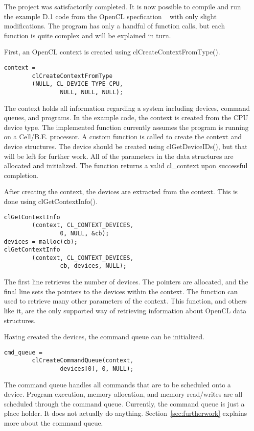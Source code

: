 The project was satisfactorily completed. It is now possible to compile and run the example D.1 code from the OpenCL specfication ~\cite{opencl} with only slight modifications. The program has only a handful of function calls, but each function is quite complex and will be explained in turn.

First, an OpenCL context is created using clCreateContextFromType().
\begin{verbatim}
context =
        clCreateContextFromType
        (NULL, CL_DEVICE_TYPE_CPU,
                NULL, NULL, NULL);
\end{verbatim}

The context holds all information regarding a system including devices, command queues, and programs. In the example code, the context is created from the CPU device type. The implemented function currently assumes the program is running on a Cell/B.E. processor. A custom function is called to create the context and device structures. The device should be created using clGetDeviceIDs(), but that will be left for further work. All of the parameters in the data structures are allocated and initialized. The function returns a valid cl\_context upon successful completion.

After creating the context, the devices are extracted from the context. This is done using clGetContextInfo().
\begin{verbatim}
clGetContextInfo
        (context, CL_CONTEXT_DEVICES,
                0, NULL, &cb);
devices = malloc(cb);
clGetContextInfo
        (context, CL_CONTEXT_DEVICES,
                cb, devices, NULL);
\end{verbatim}

The first line retrieves the number of devices. The pointers are allocated, and the final line sets the pointers to the devices within the context. The function can used to retrieve many other parameters of the context. This function, and others like it, are the only supported way of retrieving information about OpenCL data structures.

Having created the devices, the command queue can be initialized.
\begin{verbatim}
cmd_queue =
        clCreateCommandQueue(context,
                devices[0], 0, NULL);
\end{verbatim}

The command queue handles all commands that are to be scheduled onto a device. Program execution, memory allocation, and memory read/writes are all scheduled through the command queue. Currently, the command queue is just a place holder. It does not actually do anything. Section~\ref{sec:furtherwork} explains more about the command queue.


